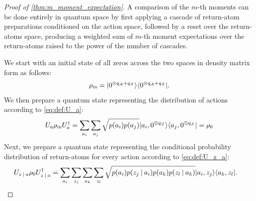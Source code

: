\documentclass{article}
\DeclarePairedDelimiter{\bra}{\langle}{\rvert} %
\DeclarePairedDelimiter{\ket}{\lvert}{\rangle} %
\newcommand{\given}[1][]{\:#1\vert\:}
\begin{document}
\begin{proof}[Proof of \cref{thm:m_moment_expectation}]
% 
% 
A comparison of the $m$-th moments can be done entirely in quantum space by first applying a cascade of return-atom preparations conditioned on the action space, followed by a reset over the return-atoms space, producing a weighted sum of $m$-th moment expectations over the return-atoms raised to the power of the number of cascades.

We start with an initial state of all zeros across the two spaces in density matrix form as follows:
% 
\begin{equation}
\rho_{{\textrm{in}}} = \ket{0^{\otimes q_{\mathcal{A}} + q_{\mathcal{Z}}}}\bra{0^{\otimes q_{\mathcal{A}} + q_{\mathcal{Z}}}}.
\end{equation}
% 
We then prepare a quantum state representing the distribution of actions according to \cref{eq:def:U_a}:
% 
\begin{equation}\label{eq:rho_0}
U_{a} \rho_{{\textrm{in}}} U_{a}^{\dagger}
= \sum_{a_i} \sum_{a_j} \sqrt{p(a_i) p(a_j)} \ket{a_i, 0^{\otimes q_{\mathcal{Z}}}} \bra{a_j, 0^{\otimes q_{\mathcal{Z}}}}
= \rho_0
\end{equation}
% 
Next, we prepare a quantum state representing the conditional probability distribution of return-atoms for every action according to \cref{eq:def:U_z_a}:
% 
\begin{align}
U_{z \given a} \rho_0 U_{z \given a}^{\dagger}
&= \sum_{a_i} \sum_{z_j} \sum_{a_k} \sum_{z_l} \sqrt{p(a_i) p(z_j \given a_i) p(a_k) p(z_l \given a_k)} \ket{a_i, z_j} \bra{a_k, z_l}.
\end{align}


\end{proof}
\end{document}
